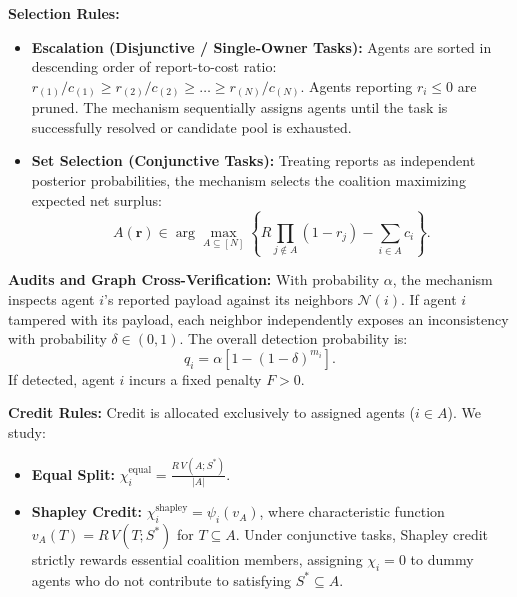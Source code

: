 \documentclass{article}
\theoremstyle{definition}
\begin{document}
\noindent \textbf{Selection Rules:}
\begin{itemize}
    \item \textbf{Escalation (Disjunctive / Single-Owner Tasks):} Agents are sorted in descending order of report-to-cost ratio: $r_{(1)}/c_{(1)} \ge r_{(2)}/c_{(2)} \ge \dots \ge r_{(N)}/c_{(N)}$. Agents reporting $r_i \le 0$ are pruned. The mechanism sequentially assigns agents until the task is successfully resolved or candidate pool is exhausted.
    \item \textbf{Set Selection (Conjunctive Tasks):} Treating reports as independent posterior probabilities, the mechanism selects the coalition maximizing expected net surplus:
    \begin{equation}
        A(\mathbf{r}) \in \arg\max_{A \subseteq [N]} \left\{ R \prod_{j \notin A} (1 - r_j) - \sum_{i \in A} c_i \right\}.
    \end{equation}
\end{itemize}

\noindent \textbf{Audits and Graph Cross-Verification:}
With probability $\alpha$, the mechanism inspects agent $i$'s reported payload against its neighbors $\mathcal{N}(i)$. If agent $i$ tampered with its payload, each neighbor independently exposes an inconsistency with probability $\delta \in (0, 1)$. The overall detection probability is:
\begin{equation}
    q_i = \alpha \left[ 1 - (1 - \delta)^{m_i} \right].
\end{equation}
If detected, agent $i$ incurs a fixed penalty $F > 0$.

\noindent \textbf{Credit Rules:}
Credit is allocated exclusively to assigned agents ($i \in A$). We study:
\begin{itemize}
    \item \textbf{Equal Split:} $\chi_i^{\mathrm{equal}} = \frac{R\, V(A; S^*)}{|A|}$.
    \item \textbf{Shapley Credit:} $\chi_i^{\mathrm{shapley}} = \psi_i(v_A)$, where characteristic function $v_A(T) = R\, V(T; S^*)$ for $T \subseteq A$. Under conjunctive tasks, Shapley credit strictly rewards essential coalition members, assigning $\chi_i = 0$ to dummy agents who do not contribute to satisfying $S^* \subseteq A$.
\end{itemize}
\end{document}
